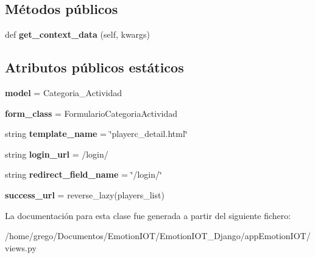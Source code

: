 \subsection*{Métodos públicos}
\begin{DoxyCompactItemize}
\item 
def {\bfseries get\+\_\+context\+\_\+data} (self, kwargs)\hypertarget{classappEmotionIOT_1_1views_1_1Add__category__player_ad932255a6e6594ff3bae1f0b3c5e3278}{}\label{classappEmotionIOT_1_1views_1_1Add__category__player_ad932255a6e6594ff3bae1f0b3c5e3278}

\end{DoxyCompactItemize}
\subsection*{Atributos públicos estáticos}
\begin{DoxyCompactItemize}
\item 
{\bfseries model} = Categoria\+\_\+\+Actividad\hypertarget{classappEmotionIOT_1_1views_1_1Add__category__player_a8cf737e1a391e1864cec479c2519b4be}{}\label{classappEmotionIOT_1_1views_1_1Add__category__player_a8cf737e1a391e1864cec479c2519b4be}

\item 
{\bfseries form\+\_\+class} = Formulario\+Categoria\+Actividad\hypertarget{classappEmotionIOT_1_1views_1_1Add__category__player_a212f0edac21d4c4a6284729a8dbe8c49}{}\label{classappEmotionIOT_1_1views_1_1Add__category__player_a212f0edac21d4c4a6284729a8dbe8c49}

\item 
string {\bfseries template\+\_\+name} = \char`\"{}playerc\+\_\+detail.\+html\char`\"{}\hypertarget{classappEmotionIOT_1_1views_1_1Add__category__player_a64d8d2f369c2fd9d4fe8b240ca2c003e}{}\label{classappEmotionIOT_1_1views_1_1Add__category__player_a64d8d2f369c2fd9d4fe8b240ca2c003e}

\item 
string {\bfseries login\+\_\+url} = \textquotesingle{}/login/\textquotesingle{}\hypertarget{classappEmotionIOT_1_1views_1_1Add__category__player_a22d51896be16994b9dfcb2bc747e4501}{}\label{classappEmotionIOT_1_1views_1_1Add__category__player_a22d51896be16994b9dfcb2bc747e4501}

\item 
string {\bfseries redirect\+\_\+field\+\_\+name} = \char`\"{}/login/\char`\"{}\hypertarget{classappEmotionIOT_1_1views_1_1Add__category__player_a957a249336ae7e7829ae69f9f023cbdc}{}\label{classappEmotionIOT_1_1views_1_1Add__category__player_a957a249336ae7e7829ae69f9f023cbdc}

\item 
{\bfseries success\+\_\+url} = reverse\+\_\+lazy(\textquotesingle{}players\+\_\+list\textquotesingle{})\hypertarget{classappEmotionIOT_1_1views_1_1Add__category__player_ab0a240359d2fdc625470af5ef5779ebb}{}\label{classappEmotionIOT_1_1views_1_1Add__category__player_ab0a240359d2fdc625470af5ef5779ebb}

\end{DoxyCompactItemize}


La documentación para esta clase fue generada a partir del siguiente fichero\+:\begin{DoxyCompactItemize}
\item 
/home/grego/\+Documentos/\+Emotion\+I\+O\+T/\+Emotion\+I\+O\+T\+\_\+\+Django/app\+Emotion\+I\+O\+T/views.\+py\end{DoxyCompactItemize}
